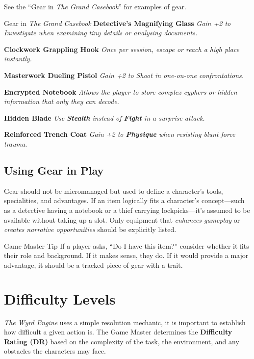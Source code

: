 See the ``Gear in \emph{The Grand Casebook}'' for examples of gear.

\begin{DndSidebar}[float=!t]{Gear in \emph{The Grand Casebook}}
\textbf{Detective’s Magnifying Glass}  
\emph{Gain +2 to Investigate when examining tiny details or analysing documents.}

\textbf{Clockwork Grappling Hook}  
\emph{Once per session, escape or reach a high place instantly.}

\textbf{Masterwork Dueling Pistol}  
\emph{Gain +2 to Shoot in one-on-one confrontations.}

\textbf{Encrypted Notebook}  
\emph{Allows the player to store complex cyphers or hidden information that only they can decode.}

\textbf{Hidden Blade}  
\emph{Use \textbf{Stealth} instead of \textbf{Fight} in a surprise attack.}

\textbf{Reinforced Trench Coat}  
\emph{Gain +2 to \textbf{Physique} when resisting blunt force trauma.}
\end{DndSidebar}

\subsection{Using Gear in Play}
Gear should not be micromanaged but used to define a character’s tools, specialities, and advantages. If an item logically fits a character’s concept—such as a detective having a notebook or a thief carrying lockpicks—it’s assumed to be available without taking up a slot. Only equipment that \emph{enhances gameplay} or \emph{creates narrative opportunities} should be explicitly listed.

\begin{DndComment}{Game Master Tip}
If a player asks, “Do I have this item?” consider whether it fits their role and background. If it makes sense, they do. If it would provide a major advantage, it should be a tracked piece of gear with a trait.
\end{DndComment}


\section{Difficulty Levels}

 \emph{The Wyrd Engine} uses a simple resolution mechanic, it is important to establish how difficult a given action is. The Game Master determines the \textbf{Difficulty Rating (DR)} based on the complexity of the task, the environment, and any obstacles the characters may face.

